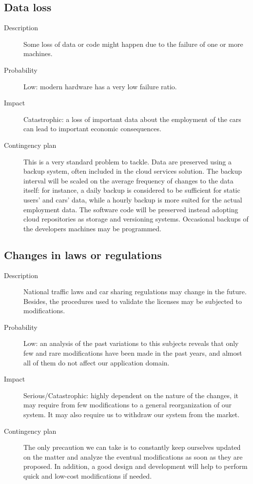 \subsection*{Data loss}
	\begin{description}
		\item[Description] Some loss of data or code might happen due to the failure of one or more machines.
		\item[Probability] Low: modern hardware has a very low failure ratio.
		\item[Impact] Catastrophic: a loss of important data about the employment of the cars can lead to important economic consequences.
		\item[Contingency plan] This is a very standard problem to tackle. Data are preserved using a backup system, often included in the cloud services solution. The backup interval will be scaled on the average frequency of changes to the data itself: for instance, a daily backup is considered to be sufficient for static users' and cars' data, while a hourly backup is more suited for the actual employment data.\newline
		The software code will be preserved instead adopting cloud repositories as storage and versioning systems. Occasional backups of the developers machines may be programmed.
	\end{description}

\subsection*{Changes in laws or regulations}
	\begin{description}
		\item[Description] National traffic laws and car sharing regulations may change in the future. Besides, the procedures used to validate the licenses may be subjected to modifications.
		\item[Probability] Low: an analysis of the past variations to this subjects reveals that only few and rare modifications have been made in the past years, and almost all of them do not affect our application domain.
		\item[Impact] Serious/Catastrophic: highly dependent on the nature of the changes, it may require from few modifications to a general reorganization of our system. It may also require us to withdraw our system from the market.
		\item[Contingency plan] The only precaution we can take is to constantly keep ourselves updated on the matter and analyze the eventual modifications as soon as they are proposed. In addition, a good design and development will help to perform quick and low-cost modifications if needed.
	\end{description}


